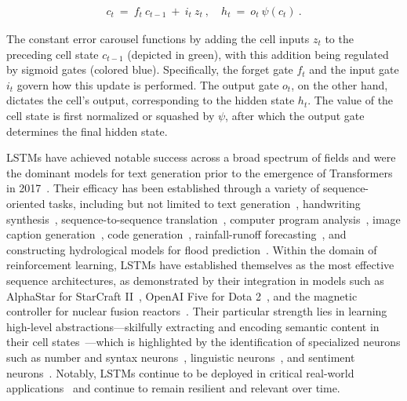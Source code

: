 \begin{align}
\label{eq:lstm_idea}
  c_t \ = \ f_t \ c_{t-1} \ + \ 
          i_t \  z_t \ , \quad  
          h_t \ = \ o_t \ \psi({c_t}) \ . 
\end{align}

The constant error carousel functions by adding the cell inputs $z_t$ to the preceding cell state $c_{t-1}$ (depicted in green), with this addition being regulated by sigmoid gates (colored blue). Specifically, the forget gate $f_t$ and the input gate $i_t$ govern how this update is performed. The output gate $o_t$, on the other hand, dictates the cell's output, corresponding to the hidden state $h_t$. The value of the cell state is first normalized or squashed by $\psi$, after which the output gate determines the final hidden state.

LSTMs have achieved notable success across a broad spectrum of fields \citep{Hochreiter:01,Hochreiter:07,Schmidhuber:15} and were the dominant models for text generation prior to the emergence of Transformers in 2017~\citep{Vaswani:17}. Their efficacy has been established through a variety of sequence-oriented tasks, including but not limited to text generation~\citep{Graves:13,Karpathy:15blog}, handwriting synthesis~\citep{Graves:13}, sequence-to-sequence translation~\citep{Sutskever:14nips}, computer program analysis~\citep{Zaremba:14arxiv}, image caption generation~\citep{Karpathy:15,Hossain:19}, code generation~\citep{Karpathy:15blog}, rainfall-runoff forecasting~\citep{Kratzert:18,Kratzert:19}, and constructing hydrological models for flood prediction~\citep{Nearing:24}. Within the domain of reinforcement learning, LSTMs have established themselves as the most effective sequence architectures, as demonstrated by their integration in models such as AlphaStar for StarCraft II~\citep{Vinyals:17short}, OpenAI Five for Dota 2~\citep{OpenAI:19}, and the magnetic controller for nuclear fusion reactors~\citep{Degrave:22short}. Their particular strength lies in learning high-level abstractions—skilfully extracting and encoding semantic content in their cell states~\citep{Karpathy:15blog}—which is highlighted by the identification of specialized neurons such as number and syntax neurons~\citep{Lakretz:19}, linguistic neurons~\citep{Bau:19}, and sentiment neurons~\citep{Radford:17arxiv}. Notably, LSTMs continue to be deployed in critical real-world applications~\citep{Degrave:22short,Nearing:24} and continue to remain resilient and relevant over time.

